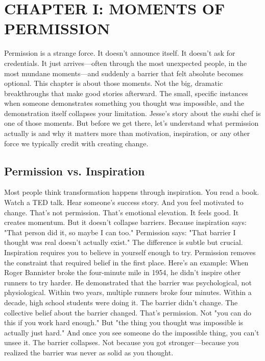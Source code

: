 \cleardoublepage

\chapter{CHAPTER I: MOMENTS OF PERMISSION}

Permission is a strange force.
It doesn't announce itself. It doesn't ask for credentials. It just arrives—often through the most unexpected people, in the most mundane moments—and suddenly a barrier that felt absolute becomes optional.
This chapter is about those moments.
Not the big, dramatic breakthroughs that make good stories afterward. The small, specific instances when someone demonstrates something you thought was impossible, and the demonstration itself collapses your limitation.
Jesse's story about the sushi chef is one of those moments. But before we get there, let's understand what permission actually is and why it matters more than motivation, inspiration, or any other force we typically credit with creating change.

\section{Permission vs. Inspiration}

Most people think transformation happens through inspiration.
You read a book. Watch a TED talk. Hear someone's success story. And you feel motivated to change.
That's not permission. That's emotional elevation.
It feels good. It creates momentum. But it doesn't collapse barriers. Because inspiration says: "That person did it, so maybe I can too."
Permission says: "That barrier I thought was real doesn't actually exist."
The difference is subtle but crucial.
Inspiration requires you to believe in yourself enough to try. Permission removes the constraint that required belief in the first place.
Here's an example:
When Roger Bannister broke the four-minute mile in 1954, he didn't inspire other runners to try harder. He demonstrated that the barrier was psychological, not physiological. Within two years, multiple runners broke four minutes. Within a decade, high school students were doing it.
The barrier didn't change. The collective belief about the barrier changed.
That's permission. Not "you can do this if you work hard enough." But "the thing you thought was impossible is actually just hard."
And once you see someone do the impossible thing, you can't unsee it. The barrier collapses. Not because you got stronger—because you realized the barrier was never as solid as you thought.


